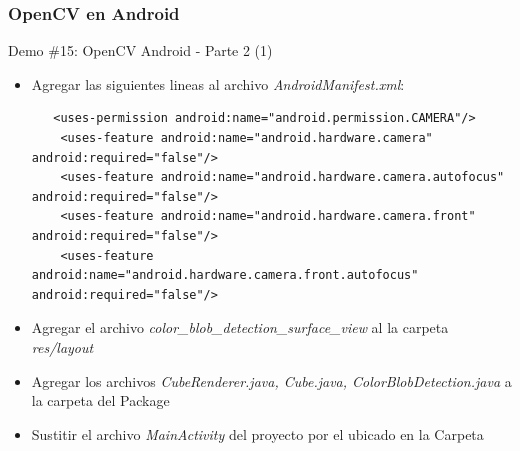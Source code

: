 \documentclass[aspectratio=169,compress]{beamer}
\begin{document}
\begin{frame}[fragile]
\frametitle{OpenCV en Android}
\begin{block}{Demo \#15: OpenCV Android  - Parte 2 (1)}
\begin{itemize}

\item Agregar las siguientes lineas al archivo \textit{AndroidManifest.xml}:
\begin{verbatim}
   <uses-permission android:name="android.permission.CAMERA"/>
    <uses-feature android:name="android.hardware.camera" android:required="false"/>
    <uses-feature android:name="android.hardware.camera.autofocus" android:required="false"/>
    <uses-feature android:name="android.hardware.camera.front" android:required="false"/>
    <uses-feature android:name="android.hardware.camera.front.autofocus" android:required="false"/>
\end{verbatim}
\item Agregar el archivo \textit{color\_blob\_detection\_surface\_view} al la carpeta \textit{res/layout}
\item Agregar los archivos \textit{CubeRenderer.java, Cube.java, ColorBlobDetection.java} a la carpeta del Package
\item Sustitir el archivo \textit{MainActivity} del proyecto por el ubicado en la Carpeta
\end{itemize}
\end{block}
\end{frame}
\end{document}
